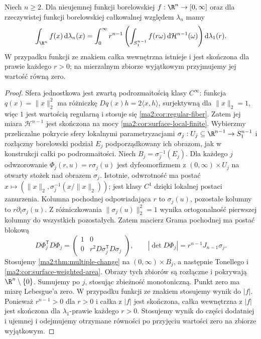 \begin{twierdzenie}
\label{ma2:thm:surface-radial}
Niech $n\ge2$. Dla nieujemnej funkcji borelowskiej
$f:\R^n\to[0,\infty]$ oraz dla rzeczywistej funkcji
borelowskiej całkowalnej względem $\lambda_n$ mamy
\[
 \int_{\R^n}f(x)\,\mathrm d\lambda_n(x)
 =\int_0^\infty r^{n-1}
 \left(\int_{S_1^{n-1}}f(r\omega)\,
 \mathrm d\mathcal H^{n-1}(\omega)\right)
 \mathrm d\lambda_1(r).
\]
W przypadku funkcji ze znakiem całka wewnętrzna
istnieje i jest skończona dla prawie każdego $r>0$;
na mierzalnym zbiorze wyjątkowym przyjmujemy
jej wartość równą zero.
\end{twierdzenie}
\begin{proof}
Sfera jednostkowa jest zwartą podrozmaitością
klasy $C^\infty$: funkcja $q(x)=\|x\|_2^2$
ma różniczkę $Dq(x)h=2\langle x,h\rangle$,
surjektywną dla $\|x\|_2=1$, więc $1$ jest
wartością regularną i stosuje się
\ref{ma2:cor:regular-fiber}. Zatem jej miara
$\mathcal H^{n-1}$ jest skończona na mocy
\ref{ma2:cor:surface-local-finite}.
Wybierzmy przeliczalne pokrycie sfery lokalnymi
parametryzacjami $\sigma_j:U_j\subseteq\R^{n-1}
\to S_1^{n-1}$ i rozłączny borelowski podział
$E_j$ podporządkowany ich obrazom, jak w
konstrukcji całki po podrozmaitości.
Niech $B_j=\sigma_j^{-1}(E_j)$.
Dla każdego $j$ odwzorowanie
$\Phi_j(r,u)=r\sigma_j(u)$ jest dyfeomorfizmem
z $(0,\infty)\times U_j$ na otwarty stożek
nad obrazem $\sigma_j$. Istotnie, odwrotność
ma postać
$x\mapsto(\|x\|_2,\sigma_j^{-1}(x/\|x\|_2))$;
jest klasy $C^1$ dzięki lokalnej postaci zanurzenia.
Kolumna pochodnej odpowiadająca $r$ to $\sigma_j(u)$,
pozostałe kolumny to $r\partial_i\sigma_j(u)$.
Z różniczkowania $\|\sigma_j(u)\|_2^2=1$
wynika ortogonalność pierwszej kolumny
do wszystkich pozostałych. Zatem macierz Grama
pochodnej ma postać blokową
\[
 D\Phi_j^{\mathsf T}D\Phi_j
 =\begin{pmatrix}1&0\\0&r^2D\sigma_j^{\mathsf T}D\sigma_j\end{pmatrix},
 \qquad
 |\det D\Phi_j|=r^{n-1}J_{n-1}\sigma_j.
\]
Stosujemy \ref{ma2:thm:multiple-change} na
$(0,\infty)\times B_j$, a następnie Tonellego
i \ref{ma2:cor:surface-weighted-area}.
Obrazy tych zbiorów są rozłączne i pokrywają
$\R^n\setminus\{0\}$. Sumujemy po $j$,
stosując zbieżność monotoniczną.
Punkt zero ma miarę Lebesgue'a zero.
W przypadku funkcji ze znakiem stosujemy
wynik do $|f|$. Ponieważ $r^{n-1}>0$ dla $r>0$
i całka z $|f|$ jest skończona, całka wewnętrzna
z $|f|$ jest skończona dla $\lambda_1$-prawie
każdego $r>0$. Stosujemy wynik do części
dodatniej i ujemnej i odejmujemy otrzymane
równości po przyjęciu wartości zero na zbiorze
wyjątkowym.
\end{proof}

